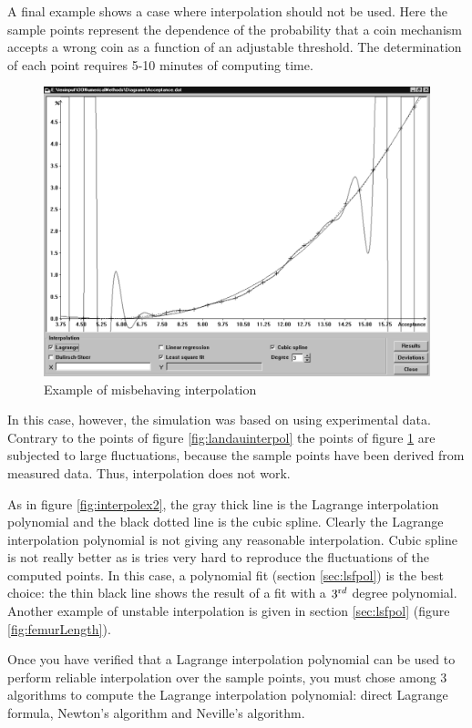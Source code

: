 A final example shows a case where interpolation should not be
used. Here the sample points represent the dependence of the
probability that a coin mechanism accepts a wrong coin as a
function of an adjustable threshold. The determination of each
point requires 5-10 minutes of computing time.
\begin{figure}
\label{fig:interpolex4}
\centering\includegraphics[width=12cm]{Figures/BadInterpolation}
\caption{Example of misbehaving interpolation}
\end{figure}
In this case, however, the simulation was based on using
experimental data. Contrary to the points of figure
\ref{fig:landauinterpol} the points of figure
\ref{fig:interpolex4} are subjected to large fluctuations, because
the sample points have been derived from measured data. Thus,
interpolation does not work.

As in figure \ref{fig:interpolex2}, the gray thick line is the
Lagrange interpolation polynomial and the black dotted line is the
cubic spline. Clearly the Lagrange interpolation polynomial is not
giving any reasonable interpolation. Cubic spline is not really
better as is tries very hard to reproduce the fluctuations of the
computed points. In this case, a polynomial fit (\cf section
\ref{sec:lsfpol}) is the best choice: the thin black line shows
the result of a fit with a $3^{\mathop{\textrm rd}}$ degree
polynomial. Another example of unstable interpolation is given in
section \ref{sec:lsfpol} (figure \ref{fig:femurLength}).

 Once
you have verified that a Lagrange interpolation polynomial can be
used to perform reliable interpolation over the sample points, you
must chose among 3 algorithms to compute the Lagrange
interpolation polynomial: direct Lagrange formula, Newton's
algorithm and Neville's algorithm.

